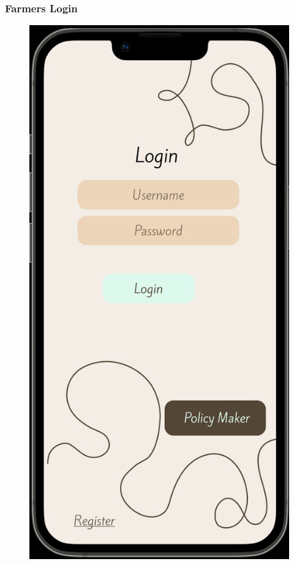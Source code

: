 \subsubsection{Farmers Login}
    \begin{figure}[ht]
        \centering
        \includegraphics[width = 0.6\linewidth]{figures/loginFarmers.png}
        \label{fig:login}
    \end{figure}

\clearpage
